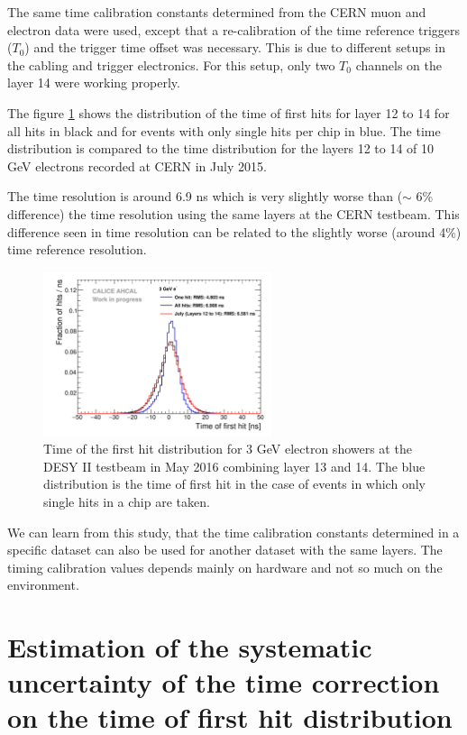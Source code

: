 The same time calibration constants determined from the CERN muon and electron data were used, except that a re-calibration of the time reference triggers ($T_{0}$) and the trigger time offset was necessary. This is due to different setups in the cabling and trigger electronics. For this setup, only two $T_{0}$ channels on the layer 14 were working properly.

The figure \ref{fig:TBMay2016} shows the distribution of the time of first hits for layer 12 to 14 for all hits in black and for events with only single hits per chip in blue. The time distribution is compared to the time distribution for the layers 12 to 14 of 10 GeV electrons recorded at CERN in July 2015.

The time resolution is around 6.9 ns which is very slightly worse than ($\sim$ 6\% difference) the time resolution using the same layers at the CERN testbeam. This difference seen in time resolution can be related to the slightly worse (around 4\%) time reference resolution.

\begin{figure}[htbp!]
	\centering
	\includegraphics[width=0.6\textwidth]{../Thesis_Plots/Timing/Electrons/Plots/Timing_May2016_BigLayers.pdf}
	\caption{Time of the first hit distribution for 3 GeV electron showers at the DESY II testbeam in May 2016 combining layer 13 and 14. The blue distribution is the time of first hit in the case of events in which only single hits in a chip are taken.}\label{fig:TBMay2016}
\end{figure}

We can learn from this study, that the time calibration constants determined in a specific dataset can also be used for another dataset with the same layers. The timing calibration values depends mainly on hardware and not so much on the environment.

\section{Estimation of the systematic uncertainty of the time correction on the time of first hit distribution}
\label{subsec:Systematic_Correction}

